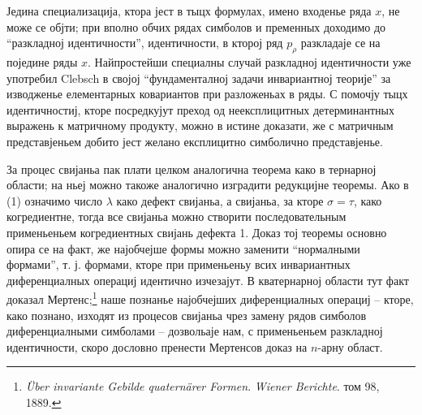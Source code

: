 ﻿\documentclass[11pt]{article}
\begin{document}
Једина специализација, ктора јест в тыцх формулах, имено входенье ряда $x$, не може се објти; при вполно обчих рядах симболов и пременных доходимо до ``разкладној идентичности'', идентичности, в кторој ряд $p_\rho$ разкладаје се на поједине ряды $x$. Найпростейши специалны случай разкладној идентичности уже употребил Clebsch в својој ``фундаменталној задачи инвариантној теорије'' за изводженье елементарных ковариантов при разложеньах в ряды. С помочју тыцх идентичностиј, кторе посредкујут преход од неексплицитных детерминантных выражень к матричному продукту, можно в истине доказати, же с матричным представјеньем добито јест желано експлицитно симболично представјенье.

За процес свијаньа пак плати целком аналогична теорема како в тернарној области; на ньеј можно такоже аналогично изградити редукцијне теоремы. Ако в (1) означимо число $\lambda$ како дефект свијаньа, а свијаньа, за кторе $\sigma=\tau$, како когредиентне, тогда все свијаньа можно створити последовательным применьеньем когредиентных свијань дефекта 1. Доказ тој теоремы основно опира се на факт, же најобчејше формы можно заменити ``нормалными формами'', т. ј. формами, кторе при применьеньу всих инвариантных диференциалных операциј идентично изчезајут. В кватернарној области тут факт доказал Мертенс;\footnote{\emph{Über invariante Gebilde quaternärer Formen}. \emph{Wiener Berichte}. том 98, 1889.} наше познанье најобчејших диференциалных операциј -- кторе, како познано, изходят из процесов свијаньа чрез замену рядов симболов диференциалными симболами -- дозвольаје нам, с применьеньем разкладној идентичности, скоро дословно пренести Мертенсов доказ на $n$-арну област.
\end{document}
